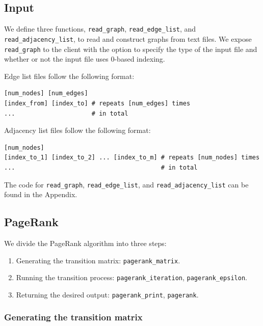\documentclass[12pt, titlepage, twoside]{amsart}
\begin{document}
\subsection{Input}

We define three functions,
\texttt{read_graph}, \texttt{read_edge_list}, and \texttt{read_adjacency_list},
to read and construct graphs from text files.
We expose \texttt{read_graph} to the client with the option to specify the type of the input file and
whether or not the input file uses 0-based indexing.

Edge list files follow the following format:

\begin{verbatim}
[num_nodes] [num_edges]
[index_from] [index_to] # repeats [num_edges] times
...                     # in total
\end{verbatim}

Adjacency list files follow the following format:

\begin{verbatim}
[num_nodes]
[index_to_1] [index_to_2] ... [index_to_m] # repeats [num_nodes] times
...                                        # in total
\end{verbatim}

The code for
\texttt{read_graph},
\texttt{read_edge_list}, and \texttt{read_adjacency_list} can be found in the
Appendix.

\subsection{PageRank}

We divide the PageRank algorithm into three steps:

\begin{enumerate}
  \item Generating the transition matrix: \texttt{pagerank_matrix}.
  \item Running the transition process: \texttt{pagerank_iteration}, \texttt{pagerank_epsilon}.
  \item Returning the desired output: \texttt{pagerank_print}, \texttt{pagerank}.
\end{enumerate}

\subsubsection{Generating the transition matrix}
\end{document}

